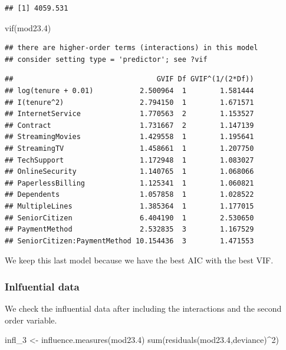 \documentclass[
  twoside]{article}
\newenvironment{Shaded}{\begin{snugshade}}{\end{snugshade}}
\newcommand{\DecValTok}[1]{\textcolor[rgb]{0.00,0.00,0.81}{#1}}
\newcommand{\FloatTok}[1]{\textcolor[rgb]{0.00,0.00,0.81}{#1}}
\newcommand{\FunctionTok}[1]{\textcolor[rgb]{0.00,0.00,0.00}{#1}}
\newcommand{\NormalTok}[1]{#1}
\newcommand{\OtherTok}[1]{\textcolor[rgb]{0.56,0.35,0.01}{#1}}
\newcommand{\SpecialCharTok}[1]{\textcolor[rgb]{0.00,0.00,0.00}{#1}}
\newcommand{\StringTok}[1]{\textcolor[rgb]{0.31,0.60,0.02}{#1}}
\begin{document}
\begin{verbatim}
## [1] 4059.531
\end{verbatim}

\begin{Shaded}
\begin{Highlighting}[]
\FunctionTok{vif}\NormalTok{(mod23}\FloatTok{.4}\NormalTok{)}
\end{Highlighting}
\end{Shaded}

\begin{verbatim}
## there are higher-order terms (interactions) in this model
## consider setting type = 'predictor'; see ?vif
\end{verbatim}

\begin{verbatim}
##                                  GVIF Df GVIF^(1/(2*Df))
## log(tenure + 0.01)           2.500964  1        1.581444
## I(tenure^2)                  2.794150  1        1.671571
## InternetService              1.770563  2        1.153527
## Contract                     1.731667  2        1.147139
## StreamingMovies              1.429558  1        1.195641
## StreamingTV                  1.458661  1        1.207750
## TechSupport                  1.172948  1        1.083027
## OnlineSecurity               1.140765  1        1.068066
## PaperlessBilling             1.125341  1        1.060821
## Dependents                   1.057858  1        1.028522
## MultipleLines                1.385364  1        1.177015
## SeniorCitizen                6.404190  1        2.530650
## PaymentMethod                2.532835  3        1.167529
## SeniorCitizen:PaymentMethod 10.154436  3        1.471553
\end{verbatim}

We keep this last model because we have the best AIC with the best VIF.

\hypertarget{inlfuential-data-2}{%
\subsubsection{Inlfuential data}\label{inlfuential-data-2}}

We check the influential data after including the interactions and the
second order variable.

\begin{Shaded}
\begin{Highlighting}[]
\NormalTok{infl\_3 }\OtherTok{\textless{}{-}} \FunctionTok{influence.measures}\NormalTok{(mod23}\FloatTok{.4}\NormalTok{)}
\FunctionTok{sum}\NormalTok{(}\FunctionTok{residuals}\NormalTok{(mod23}\FloatTok{.4}\NormalTok{,}\StringTok{\textquotesingle{}deviance\textquotesingle{}}\NormalTok{)}\SpecialCharTok{\^{}}\DecValTok{2}\NormalTok{)}
\end{Highlighting}
\end{Shaded}
\end{document}
